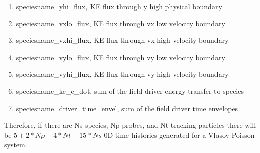 \documentclass[11pt]{amsart}
\begin{document}
\begin{enumerate}
\item speciesname\_yhi\_flux, KE flux through y high physical boundary
\item speciesname\_vxlo\_flux, KE flux through vx low velocity boundary
\item speciesname\_vxhi\_flux, KE flux through vx high velocity boundary
\item speciesname\_vylo\_flux, KE flux through vy low velocity boundary
\item speciesname\_vyhi\_flux, KE flux through vy high velocity boundary
\item speciesname\_ke\_e\_dot, sum of the field driver energy transfer to species
\item speciesname\_driver\_time\_envel, sum of the field driver time envelopes
\end{enumerate}
Therefore, if there are Ns species, Np probes, and Nt tracking particles there
will be $5+2*Np+4*Nt+15*Ns$ 0D time histories generated for a Vlasov-Poisson
system.
\end{document}
